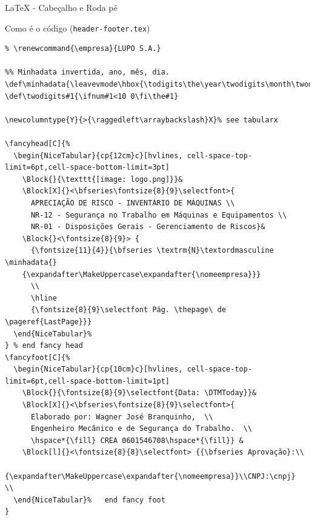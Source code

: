 \documentclass[bigger]{beamer}
\begin{document}
{\begin{frame}[label={sec:org4d7e068},fragile,shrink = 30]{\LaTeX{} - Cabeçalho e Roda pé}
 \begin{block}{Como é o código (\texttt{header-footer.tex})}
\begin{verbatim}
% \renewcommand{\empresa}{LUPO S.A.}

%% Minhadata invertida, ano, mês, dia.
\def\minhadata{\leavevmode\hbox{\todigits\the\year\twodigits\month\twodigits\day}}
\def\twodigits#1{\ifnum#1<10 0\fi\the#1}

\newcolumntype{Y}{>{\raggedleft\arraybackslash}X}% see tabularx

\fancyhead[C]{%
  \begin{NiceTabular}{cp{12cm}c}[hvlines, cell-space-top-limit=6pt,cell-space-bottom-limit=3pt]
    \Block{}{\texttt{[image: logo.png]}}&
    \Block[X]{}<\bfseries\fontsize{8}{9}\selectfont>{
      APRECIAÇÃO DE RISCO - INVENTÁRIO DE MÁQUINAS \\
      NR-12 - Segurança no Trabalho em Máquinas e Equipamentos \\
      NR-01 - Disposições Gerais - Gerenciamento de Riscos}&  
    \Block{}<\fontsize{8}{9}> {
      {\fontsize{11}{4}}{\bfseries \textrm{N}\textordmasculine \minhadata{}
	{\expandafter\MakeUppercase\expandafter{\nomeempresa}}}
      \\
      \hline
      {\fontsize{8}{9}\selectfont Pág. \thepage\ de \pageref{LastPage}}}  
  \end{NiceTabular}%  
} % end fancy head
\fancyfoot[C]{%     
  \begin{NiceTabular}{cp{10cm}c}[hvlines, cell-space-top-limit=6pt,cell-space-bottom-limit=1pt]
    \Block{}{\fontsize{8}{9}\selectfont{Data: \DTMToday}}&
    \Block[X]{}<\bfseries\fontsize{8}{9}\selectfont>{
      Elaborado por: Wagner José Branquinho,  \\
      Engenheiro Mecânico e de Segurança do Trabalho.  \\
      \hspace*{\fill} CREA 0601546708\hspace*{\fill}} & 
    \Block[l]{}<\fontsize{8}{8}\selectfont> {{\bfseries Aprovação}:\\
      {\expandafter\MakeUppercase\expandafter{\nomeempresa}}\\CNPJ:\cnpj}  \\ 
  \end{NiceTabular}%   end fancy foot
} 
\end{verbatim}
\end{block}
\end{frame}

}
\end{document}
